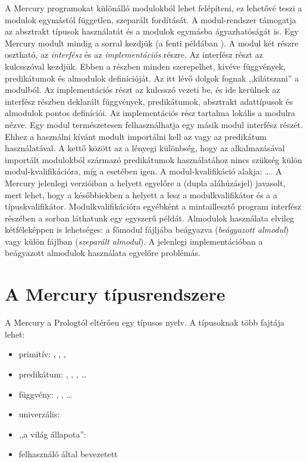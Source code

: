 A Mercury programokat különálló modulokból lehet felépíteni, ez lehetővé teszi a
modulok egymástól független, szeparált fordítását. A modul-rendszer támogatja az
absztrakt típusok használatát és a modulok egymásba ágyazhatóságát is.
\br
Egy Mercury modult mindig a   sorral kezdjük
(a fenti példában ). A modul két részre osztható, az
\emph{interfész} és az \emph{implementációs} részre. Az interfész részt az
 kulcsszóval kezdjük. Ebben a részben minden szerepelhet, kivéve
függvények, predikátumok és almodulok definícióját. Az itt lévő dolgok fognak
,,kilátszani'' a modulból. Az implementációs részt az  kulcsszó
vezeti be, és ide kerülnek az interfész részben deklarált függvények, predikátumok,
absztrakt adattípusok és almodulok pontos definíciói. Az implementációs rész tartalma
lokális a modulra nézve.
\br
Egy modul természetesen felhasználhatja egy másik modul interfész részét. Ehhez
a használni kívánt modult importálni kell az  
vagy az   predikátum használatával. A kettő
között az a lényegi különbség, hogy az  alkalmazásával importált
modulokból származó predikátumok használatához nincs szükség külön modul-kvalifikációra,
míg a  esetében igen. A modul-kvalifikáció alakja:
\cd{:}\cd{:}\dots\cd{:}\cd{:}.
A Mercury jelenlegi verzióiban a \cd{:} helyett egyelőre a \cd{\_\_} (dupla aláhúzásjel)
javasolt, mert lehet, hogy a későbbiekben a \cd{:} helyett a  lesz a
modulkvalifikátor és a \cd{:} a típuskvalifikátor. Modulkvalifikációra egyébként a
mintaillesztő program interfész részében a
 sorban láthatunk egy egyszerű példát.
\br
Almodulok használata elvileg kétféleképpen is lehetséges: a főmodul fájljába beágyazva
(\emph{beágyazott almodul}) vagy külön fájlban (\emph{szeparált almodul}). A jelenlegi
implementációban a beágyazott almodulok használata egyelőre problémás.

\section{A Mercury típusrendszere}

A Mercury a Prologtól eltérően egy típusos nyelv. A típusoknak több fajtája lehet:

\begin{itemize}
\item primitív: , , , 
\item predikátum: , , , \dots
\item függvény: , , \dots
\item univerzális: 
\item ,,a világ állapota'': 
\item felhasználó által bevezetett
\end{itemize}

